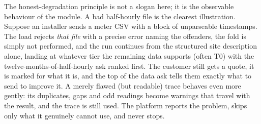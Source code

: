 The honest-degradation principle is not a slogan here; it is the observable behaviour of the module. A bad half-hourly file is the clearest illustration. Suppose an installer sends a meter CSV with a block of unparseable timestamps. The load rejects \emph{that file} with a precise error naming the offenders, the fold is simply not performed, and the run continues from the structured site description alone, landing at whatever tier the remaining data supports (often T0) with the twelve-months-of-half-hourly ask ranked first. The customer still gets a quote, it is marked for what it is, and the top of the data ask tells them exactly what to send to improve it. A merely flawed (but readable) trace behaves even more gently: its duplicates, gaps and odd readings become warnings that travel with the result, and the trace is still used. The platform reports the problem, skips only what it genuinely cannot use, and never stops.


